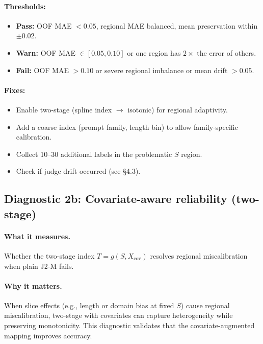 \begin{enumerate}[resume]
\paragraph{Thresholds:}
\begin{itemize}
\item \textbf{Pass:} OOF MAE $< 0.05$, regional MAE balanced, mean preservation within $\pm 0.02$.
\item \textbf{Warn:} OOF MAE $\in [0.05, 0.10]$ or one region has $2\times$ the error of others.
\item \textbf{Fail:} OOF MAE $> 0.10$ or severe regional imbalance or mean drift $> 0.05$.
\end{itemize}

\paragraph{Fixes:}
\begin{itemize}
\item Enable two-stage \autocal{} (spline index $\to$ isotonic) for regional adaptivity.
\item Add a coarse index (prompt family, length bin) to allow family-specific calibration.
\item Collect 10--30 additional labels in the problematic $S$ region.
\item Check if judge drift occurred (see §4.3).
\end{itemize}

\subsection{Diagnostic 2b: Covariate-aware reliability (two-stage)}

\paragraph{What it measures.} Whether the two-stage index $T=g(S,X_{\mathrm{cov}})$ resolves regional miscalibration when plain J2-M fails.

\paragraph{Why it matters.} When slice effects (e.g., length or domain bias at fixed $S$) cause regional miscalibration, two-stage \autocal{} with covariates can capture heterogeneity while preserving monotonicity. This diagnostic validates that the covariate-augmented mapping improves accuracy.


\end{enumerate}
